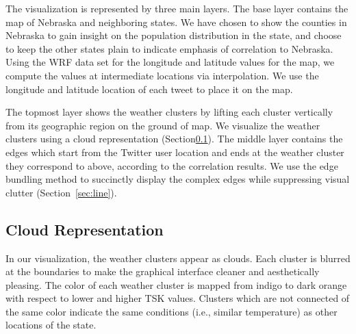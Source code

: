 The visualization is represented by three main layers. The base layer contains the map of Nebraska and neighboring states. We have chosen to show the counties in Nebraska to gain insight on the population distribution in the state, and choose to keep the other states plain to indicate emphasis of correlation to Nebraska. 
Using the WRF data set for the longitude and latitude values for the map, we compute the values at intermediate locations via interpolation. We use the longitude and latitude location of each tweet to place it on the map.

The topmost layer shows the weather clusters by lifting each cluster vertically from its geographic region on the ground of map. We visualize the weather clusters using a cloud representation (Section\ref{sec:cloud}). The middle layer contains the edges which start from the Twitter user location and ends at the weather cluster they correspond to above, according to the correlation results. We use the edge bundling method to succinctly display the complex edges while suppressing visual clutter (Section~\ref{sec:line}).

\subsection{Cloud Representation}
\label{sec:cloud}

In our visualization, the weather clusters appear as clouds. Each cluster is blurred at the boundaries to make the graphical interface cleaner and aesthetically pleasing. The color of each weather cluster is mapped from indigo to dark orange with respect to lower and higher TSK values. Clusters which are not connected of the same color indicate the same conditions (i.e., similar temperature) as other locations of the state. %

